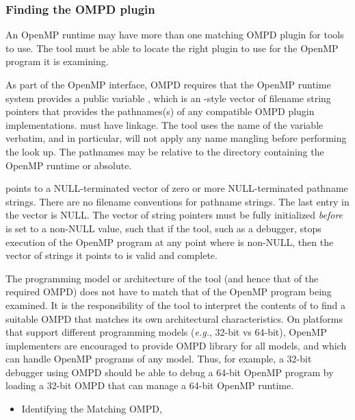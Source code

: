 \subsubsection{Finding the OMPD plugin}
\label{ompd:finding-the-ompd}

An OpenMP runtime may have more than one matching OMPD plugin for 
tools to use.
The tool must be able to locate the right plugin to use
for the OpenMP program it is examining.

As part of the OpenMP interface, OMPD requires that the OpenMP
runtime system provides a public variable ,
which is an -style vector of filename string pointers that
provides the pathnames(s) of any compatible OMPD plugin implementations.
 must have  linkage.
The tool uses the name of the variable verbatim,
and in particular, will not apply any name mangling before
performing the look up.
The pathnames may be relative to the directory containing the OpenMP runtime or absolute.

 points to a NULL-terminated
vector of zero or more NULL-terminated pathname strings.
There are no filename conventions for pathname strings.
The last entry in the vector is NULL.
The vector of string pointers must be fully initialized \emph{before}
 is set to a non-NULL value,
such that if the tool, such as a debugger,
stops execution of the OpenMP program at any point where
 is non-NULL,
then the vector of strings it points to is valid and complete.

The programming model or architecture of the tool (and hence
that of the required OMPD) does not have to match that of the OpenMP program
being examined.
It is the responsibility of the tool to interpret the contents
of  to find a suitable OMPD that matches
its own architectural characteristics.
On platforms that support different programming models
(\textit{e.g.}, 32-bit vs 64-bit), OpenMP implementers are encouraged
to provide OMPD library for all models, and which can handle
OpenMP programs of any model.
Thus, for example, a 32-bit debugger using OMPD should be able
to debug a 64-bit OpenMP program
by loading a 32-bit OMPD that can manage a 64-bit OpenMP runtime.

\crossreferences
\begin{itemize}
	\item Identifying the Matching OMPD, 
\end{itemize}



